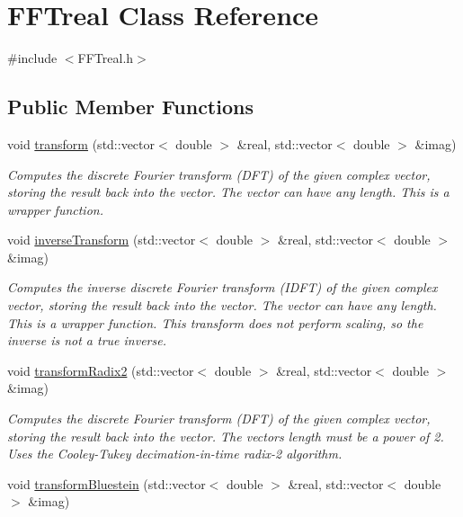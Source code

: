 \hypertarget{class_f_f_treal}{}\section{F\+F\+Treal Class Reference}
\label{class_f_f_treal}


{\ttfamily \#include $<$F\+F\+Treal.\+h$>$}

\subsection*{Public Member Functions}
\begin{DoxyCompactItemize}
\item 
void \mbox{\hyperlink{class_f_f_treal_a16caf75d31c313da4c6c1659497434c2}{transform}} (std\+::vector$<$ double $>$ \&real, std\+::vector$<$ double $>$ \&imag)
\begin{DoxyCompactList}\small\item\em Computes the discrete Fourier transform (D\+FT) of the given complex vector, storing the result back into the vector. The vector can have any length. This is a wrapper function. \end{DoxyCompactList}\item 
void \mbox{\hyperlink{class_f_f_treal_a1db8c322c9e02acf725f5599c8924d0a}{inverse\+Transform}} (std\+::vector$<$ double $>$ \&real, std\+::vector$<$ double $>$ \&imag)
\begin{DoxyCompactList}\small\item\em Computes the inverse discrete Fourier transform (I\+D\+FT) of the given complex vector, storing the result back into the vector. The vector can have any length. This is a wrapper function. This transform does not perform scaling, so the inverse is not a true inverse. \end{DoxyCompactList}\item 
void \mbox{\hyperlink{class_f_f_treal_afa3f0e3c25513ee26c9698b864330df9}{transform\+Radix2}} (std\+::vector$<$ double $>$ \&real, std\+::vector$<$ double $>$ \&imag)
\begin{DoxyCompactList}\small\item\em Computes the discrete Fourier transform (D\+FT) of the given complex vector, storing the result back into the vector. The vector\textquotesingle{}s length must be a power of 2. Uses the Cooley-\/\+Tukey decimation-\/in-\/time radix-\/2 algorithm. \end{DoxyCompactList}\item 
void \mbox{\hyperlink{class_f_f_treal_a05861961bccf522231faf434b806e882}{transform\+Bluestein}} (std\+::vector$<$ double $>$ \&real, std\+::vector$<$ double $>$ \&imag)

\end{DoxyCompactItemize}
